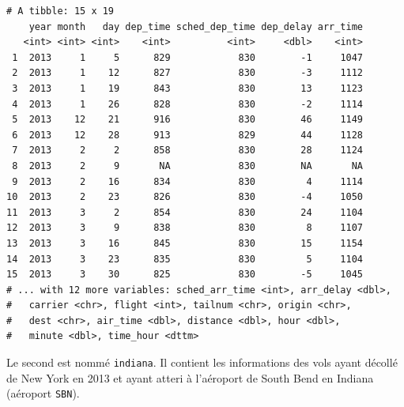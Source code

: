 \documentclass[
  a4paper,
]{article}
\newenvironment{Shaded}{\begin{snugshade}}{\end{snugshade}}
\newcommand{\KeywordTok}[1]{\textcolor[rgb]{0.12,0.11,0.11}{\textbf{#1}}}
\newcommand{\NormalTok}[1]{\textcolor[rgb]{0.12,0.11,0.11}{#1}}
\newcommand{\OperatorTok}[1]{\textcolor[rgb]{0.12,0.11,0.11}{#1}}
\newcommand{\StringTok}[1]{\textcolor[rgb]{0.75,0.01,0.01}{#1}}
\begin{document}
\begin{verbatim}
# A tibble: 15 x 19
    year month   day dep_time sched_dep_time dep_delay arr_time
   <int> <int> <int>    <int>          <int>     <dbl>    <int>
 1  2013     1     5      829            830        -1     1047
 2  2013     1    12      827            830        -3     1112
 3  2013     1    19      843            830        13     1123
 4  2013     1    26      828            830        -2     1114
 5  2013    12    21      916            830        46     1149
 6  2013    12    28      913            829        44     1128
 7  2013     2     2      858            830        28     1124
 8  2013     2     9       NA            830        NA       NA
 9  2013     2    16      834            830         4     1114
10  2013     2    23      826            830        -4     1050
11  2013     3     2      854            830        24     1104
12  2013     3     9      838            830         8     1107
13  2013     3    16      845            830        15     1154
14  2013     3    23      835            830         5     1104
15  2013     3    30      825            830        -5     1045
# ... with 12 more variables: sched_arr_time <int>, arr_delay <dbl>,
#   carrier <chr>, flight <int>, tailnum <chr>, origin <chr>,
#   dest <chr>, air_time <dbl>, distance <dbl>, hour <dbl>,
#   minute <dbl>, time_hour <dttm>
\end{verbatim}

Le second est nommé \texttt{indiana}. Il contient les informations des vols ayant décollé de New York en 2013 et ayant atteri à l'aéroport de South Bend en Indiana (aéroport \texttt{SBN}).

\begin{Shaded}
\end{Shaded}
\end{document}
